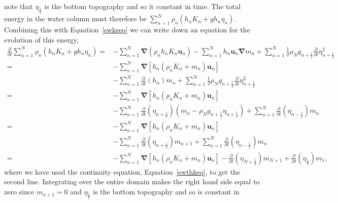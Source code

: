 \documentclass[12pt,a4paper]{report}
\newcommand*\equref[1]{Equation~\eqref{#1}}
\newcommand*{\half}{\frac{1}{2}}
\begin{document}
    note that $\eta_{\half }$ is the bottom topography and so it constant
    in time. The total energy in the
    water column must therefore be $\sum_{n=1}^{N} \rho_{n}\left(h_{n} K_{n}+ g h_{n}\eta_{n}\right)$. Combining this with \equref{swkeeq} we
    can write down an equation for the evolution of this energy,
    \begin{equation}
    \begin{split}
    \frac{\partial}{\partial t}\sum_{n=1}^{N} \rho_{n}\left(h_{n} K_{n}+ g h_{n}\eta_{n}\right) 
    =& -\sum_{n=1}^{N} \boldsymbol{\nabla} \left(\rho_{n} h_{n} K_{n} \boldsymbol{u}_{n}\right) 
    -\sum_{n=1}^{N}  h_{n} \boldsymbol{u}_{n}  \boldsymbol{\nabla} m_{n}
    +\sum_{n=1}^{N}\half  \rho_{N} g_{n+\half } \frac{\partial}{\partial t}\eta_{n+\half }^{2} \\
    =& -\sum_{n=1}^{N} \boldsymbol{\nabla} \left[h_{n}  \left(\rho_{n}K_{n}+ m_{n}\right) \boldsymbol{u}_{n}\right]  \\
    &-\sum_{n=1}^{N} \frac{\partial}{\partial t}\left(h_{n}\right)   m_{n}
    +\sum_{n=1}^{N}\half  \rho_{N} g_{n+\half } \frac{\partial}{\partial t}\eta_{n+\half }^{2} \\
    =& -\sum_{n=1}^{N} \boldsymbol{\nabla} \left[h_{n} \left(\rho_{n}K_{n}+m_{n}\right) \boldsymbol{u}_{n}\right]  \\
    &-\sum_{n=1}^{N} \frac{\partial}{\partial t}\left(\eta_{n+\half }\right)\left(   m_{n}- \rho_{N}g_{n+\half } \eta_{n+\half }\right) 
    +\sum_{n=1}^{N} \frac{\partial}{\partial t}\left(\eta_{n-\half }\right)   m_{n} \\
    =& -\sum_{n=1}^{N} \boldsymbol{\nabla} \left[h_{n} \left(\rho_{n}K_{n}+m_{n}\right) \boldsymbol{u}_{n}\right] \\
    &-\sum_{n=1}^{N} \frac{\partial}{\partial t}\left(\eta_{n+\half }\right)    m_{n+1} +\sum_{n=1}^{N} \frac{\partial}{\partial t}\left(\eta_{n-\half }\right) m_{n}\\
    =& -\sum_{n=1}^{N} \boldsymbol{\nabla} \left[h_{n} \left(\rho_{n}K_{n}+m_{n}\right) \boldsymbol{u}_{n}\right] 
    - \frac{\partial}{\partial t}\left(\eta_{N+\half }\right)    m_{N+1} + \frac{\partial}{\partial t}\left(\eta_{\half }\right) m_{1},
    \end{split}
    \end{equation}
    where we have used the continuity equation, \equref{swthkeq}, to get the second line.
    Integrating over the entire domain makes the right hand side equal to zero since
    $m_{n+1} = 0$ and $\eta_{\half }$ is the bottom topography and so is constant in
\end{document}
